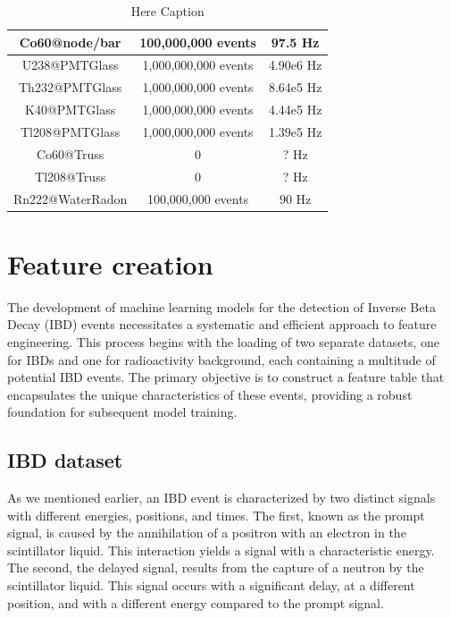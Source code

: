 \begin{table}[htp]
\begin{tabular}{|c|c|c|}
   Co60@node/bar   &  100,000,000 events   &           97.5 Hz             \\\hline
   U238@PMTGlass   & 1,000,000,000 events  &          4.90e6 Hz            \\\hline
  Th232@PMTGlass   & 1,000,000,000 events  &          8.64e5 Hz            \\\hline
   K40@PMTGlass    & 1,000,000,000 events  &          4.44e5 Hz            \\\hline
  Tl208@PMTGlass   & 1,000,000,000 events  &          1.39e5 Hz            \\\hline
    Co60@Truss     &           0           &             ? Hz              \\\hline
    Tl208@Truss    &           0           &             ? Hz              \\\hline
 Rn222@WaterRadon  &  100,000,000 events   &            90 Hz              \\\hline
\end{tabular}
\caption{Here Caption}
\label{tab:BKG_gen}
\end{table}

\newpage

\section{Feature creation}

The development of machine learning models for the detection of Inverse Beta Decay (IBD) events necessitates a systematic and efficient approach to feature engineering. This process begins with the loading of two separate datasets, one for IBDs and one for radioactivity background, each containing a multitude of potential IBD events. The primary objective is to construct a feature table that encapsulates the unique characteristics of these events, providing a robust foundation for subsequent model training.

\subsection{IBD dataset}
As we mentioned earlier, an IBD event is characterized by two distinct signals with different energies, positions, and times. The first, known as the prompt signal, is caused by the annihilation of a positron with an electron in the scintillator liquid. This interaction yields a signal with a characteristic energy. The second, the delayed signal, results from the capture of a neutron by the scintillator liquid. This signal occurs with a significant delay, at a different position, and with a different energy compared to the prompt signal.

